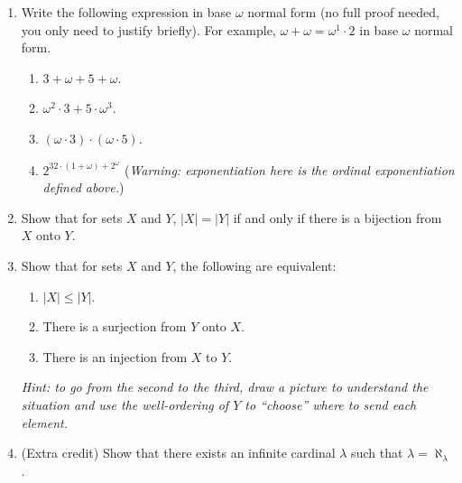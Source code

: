 \documentclass{amsart}
\theoremstyle{definition}
\begin{document}
\begin{enumerate}
\item Write the following expression in base $\omega$ normal form (no full proof needed, you only need to justify briefly). For example, $\omega + \omega = \omega^1 \cdot 2$ in base $\omega$ normal form.
  \begin{enumerate}
  \item $3 + \omega + 5 + \omega$.
  \item $\omega^2 \cdot 3 + 5 \cdot \omega^3$.
  \item $(\omega \cdot 3) \cdot (\omega \cdot 5)$.
  \item $2^{32 \cdot (1 + \omega) + 2^\omega}$ (\emph{Warning: exponentiation here is the ordinal exponentiation defined above.})
  \end{enumerate}
\item Show that for sets $X$ and $Y$, $|X| = |Y|$ if and only if there is a bijection from $X$ onto $Y$.
\item Show that for sets $X$ and $Y$, the following are equivalent:

  \begin{enumerate}
  \item $|X| \le |Y|$.
  \item There is a surjection from $Y$ onto $X$.
  \item There is an injection from $X$ to $Y$.
  \end{enumerate}

  \emph{Hint: to go from the second to the third, draw a picture to understand the situation and use the well-ordering of $Y$ to ``choose'' where to send each element.}
\item (Extra credit) Show that there exists an infinite cardinal $\lambda$ such that $\lambda = \aleph_\lambda$.
\end{enumerate}



\end{document}
